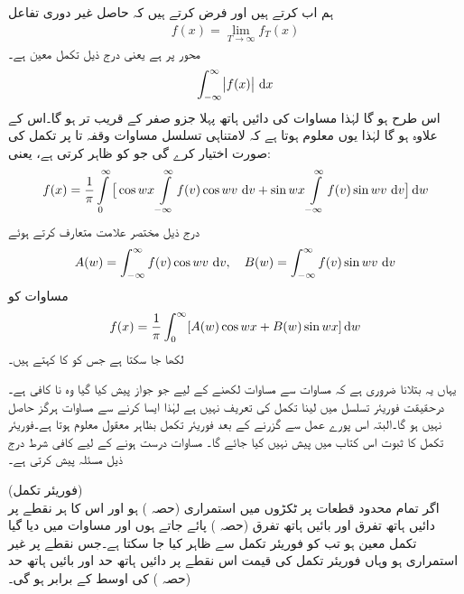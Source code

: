 ہم اب  کرتے ہیں اور فرض کرتے ہیں کہ حاصل غیر دوری تفاعل
\begin{align*}
f(x)=\lim_{T\to \infty} f_T(x)
\end{align*}
محور  پر  ہے یعنی درج ذیل تکمل معین ہے۔
\begin{align}\label{مساوات_فوریئر_تکمل_ب}
\int_{-\infty}^{\infty}\abs{f(x)}\,\dif x
\end{align} 
اس طرح  ہو گا لہٰذا مساوات  کی دائیں ہاتھ پہلا جزو صفر کے قریب تر ہو گا۔اس کے علاوہ   ہو گا لہٰذا  یوں معلوم ہوتا ہے کہ لامتناہی تسلسل مساوات  وقفہ  تا  پر تکمل کی صورت اختیار کرے گی جو  کو ظاہر کرتی ہے، یعنی:
\begin{align}\label{مساوات_فوریئر_تکمل_پ}
f(x)=\frac{1}{\pi}\int\limits_{0}^{\infty}\big[\cos wx\int\limits_{-\infty}^{\infty}f(v)\cos wv\,\dif v+\sin wx\int\limits_{-\infty}^{\infty}f(v)\sin wv\,\dif v\big]\dif w
\end{align}
درج ذیل مختصر علامت متعارف کرتے ہوئے
\begin{align}\label{مساوات_فوریئر_تکمل_ت}
A(w)=\int_{-\infty}^{\infty}f(v)\cos wv\,\dif v,\quad B(w)=\int_{-\infty}^{\infty}f(v)\sin wv\,\dif v
\end{align}
مساوات  کو
\begin{align}\label{مساوات_فوریئر_تکمل_ٹ}
f(x)=\frac{1}{\pi}\int_0^{\infty}[A(w)\cos wx+B(w)\sin wx]\dif w
\end{align}
لکھا جا سکتا ہے جس کو  کا  کہتے ہیں۔

یہاں یہ بتلانا ضروری ہے کہ مساوات  سے مساوات  لکھنے کے لیے جو جواز پیش کیا گیا وہ نا کافی ہے۔درحقیقت فوریئر تسلسل میں  لینا تکمل کی تعریف نہیں ہے لہٰذا ایسا کرنے سے مساوات  ہرگز حاصل نہیں ہو گا۔البتہ اس پورے عمل سے  گزرنے کے بعد  فوریئر تکمل بظاہر معقول معلوم ہوتا ہے۔فوریئر تکمل کا ثبوت اس کتاب میں پیش نہیں کیا جائے گا۔  مساوات  درست ہونے کے لیے کافی شرط درج ذیل مسئلہ پیش کرتی ہے۔ 

\quad (فوریئر تکمل)\\
اگر  تمام محدود قطعات پر ٹکڑوں میں استمراری (حصہ ) ہو اور اس کا ہر نقطے پر دائیں ہاتھ تفرق اور بائیں ہاتھ تفرق (حصہ ) پائے جاتے ہوں اور مساوات  میں دیا گیا تکمل معین ہو تب  کو فوریئر تکمل سے ظاہر کیا جا سکتا ہے۔جس نقطے پر  غیر استمراری ہو وہاں فوریئر تکمل کی قیمت اس نقطے پر دائیں ہاتھ حد اور بائیں ہاتھ حد (حصہ ) کی اوسط کے برابر ہو گی۔ 

